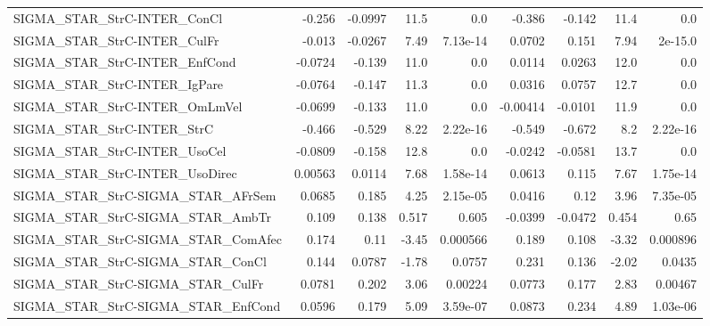 \begin{tabular}{lrrrrrrrr}
SIGMA\_STAR\_StrC-INTER\_ConCl            &      -0.256 &      -0.0997 &    11.5 &      0.0 &     -0.386 &      -0.142 &         11.4 &           0.0 \\
SIGMA\_STAR\_StrC-INTER\_CulFr            &      -0.013 &      -0.0267 &    7.49 & 7.13e-14 &     0.0702 &       0.151 &         7.94 &       2e-15.0 \\
SIGMA\_STAR\_StrC-INTER\_EnfCond          &     -0.0724 &       -0.139 &    11.0 &      0.0 &     0.0114 &      0.0263 &         12.0 &           0.0 \\
SIGMA\_STAR\_StrC-INTER\_IgPare           &     -0.0764 &       -0.147 &    11.3 &      0.0 &     0.0316 &      0.0757 &         12.7 &           0.0 \\
SIGMA\_STAR\_StrC-INTER\_OmLmVel          &     -0.0699 &       -0.133 &    11.0 &      0.0 &   -0.00414 &     -0.0101 &         11.9 &           0.0 \\
SIGMA\_STAR\_StrC-INTER\_StrC             &      -0.466 &       -0.529 &    8.22 & 2.22e-16 &     -0.549 &      -0.672 &          8.2 &      2.22e-16 \\
SIGMA\_STAR\_StrC-INTER\_UsoCel           &     -0.0809 &       -0.158 &    12.8 &      0.0 &    -0.0242 &     -0.0581 &         13.7 &           0.0 \\
SIGMA\_STAR\_StrC-INTER\_UsoDirec         &     0.00563 &       0.0114 &    7.68 & 1.58e-14 &     0.0613 &       0.115 &         7.67 &      1.75e-14 \\
SIGMA\_STAR\_StrC-SIGMA\_STAR\_AFrSem      &      0.0685 &        0.185 &    4.25 & 2.15e-05 &     0.0416 &        0.12 &         3.96 &      7.35e-05 \\
SIGMA\_STAR\_StrC-SIGMA\_STAR\_AmbTr       &       0.109 &        0.138 &   0.517 &    0.605 &    -0.0399 &     -0.0472 &        0.454 &          0.65 \\
SIGMA\_STAR\_StrC-SIGMA\_STAR\_ComAfec     &       0.174 &         0.11 &   -3.45 & 0.000566 &      0.189 &       0.108 &        -3.32 &      0.000896 \\
SIGMA\_STAR\_StrC-SIGMA\_STAR\_ConCl       &       0.144 &       0.0787 &   -1.78 &   0.0757 &      0.231 &       0.136 &        -2.02 &        0.0435 \\
SIGMA\_STAR\_StrC-SIGMA\_STAR\_CulFr       &      0.0781 &        0.202 &    3.06 &  0.00224 &     0.0773 &       0.177 &         2.83 &       0.00467 \\
SIGMA\_STAR\_StrC-SIGMA\_STAR\_EnfCond     &      0.0596 &        0.179 &    5.09 & 3.59e-07 &     0.0873 &       0.234 &         4.89 &      1.03e-06 \\

\end{tabular}
